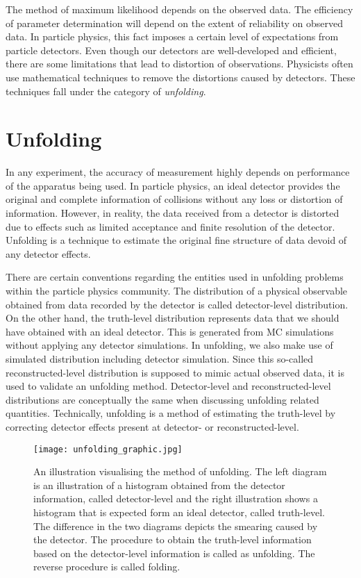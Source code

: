 The method of maximum likelihood depends on the observed data. The efficiency of parameter determination
will depend on the extent of reliability on observed data. In particle physics, this fact imposes a 
certain level of expectations from particle detectors. Even though our detectors are well-developed
and efficient, there are some limitations that lead to distortion of observations. Physicists often use
mathematical techniques to remove the distortions caused by detectors. These techniques fall under the
category of \textit{unfolding}.  

\section{Unfolding}

In any experiment, the accuracy of measurement highly depends on performance of the apparatus 
being used. In particle physics, an ideal detector provides the original and complete information 
of collisions without any loss or distortion of information. However, in reality, the data received 
from a detector is distorted due to effects such as limited acceptance and 
finite resolution of the detector. Unfolding is a technique to estimate the original fine structure
of data devoid of any detector effects.

There are certain conventions regarding the entities used in unfolding problems within the particle physics 
community. The distribution of a physical observable obtained from data recorded by the detector is called detector-level 
distribution. On the other hand, the truth-level distribution represents data that we should
have obtained with an ideal detector. This is generated from MC simulations without applying any detector
simulations. In unfolding, we also make use of simulated distribution including detector simulation.
Since this so-called reconstructed-level distribution is supposed to mimic actual observed data, it is 
used to validate an unfolding method. Detector-level and reconstructed-level distributions are 
conceptually the same when discussing unfolding related quantities. Technically, unfolding
is a method of estimating the truth-level by correcting detector effects present at detector- or
reconstructed-level.

\begin{figure}
    \centering
        \texttt{[image: unfolding\_graphic.jpg]}
        \caption{An illustration visualising the method of unfolding. The left diagram is an illustration
        of a histogram obtained from the detector information, called detector-level and the right 
        illustration shows a histogram that is expected form an ideal detector, called truth-level.
        The difference in the two diagrams depicts the smearing caused by the detector. The procedure to
        obtain the truth-level information based on the detector-level information is called as 
        unfolding. The reverse procedure is called folding.}
           \label{fig:unf_graphic}
  \end{figure}

